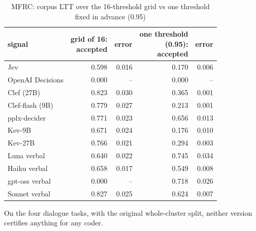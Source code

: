 \begin{table}[t]
\centering
\small
\caption{MFRC: corpus LTT over the 16-threshold grid vs one threshold fixed in advance (0.95)}
\label{tab:tab23_ltt_single_threshold}
\begin{adjustbox}{max width=\linewidth}
\begin{tabular}{lrrrr}
\toprule
signal & \makecell[br]{grid of 16: \\{} accepted} & error & \makecell[br]{one threshold \\{} (0.95): \\{} accepted} & error \\
\midrule
Jev & 0.598 & 0.016 & 0.170 & 0.006 \\
OpenAI Decisions & 0.000 & -- & 0.000 & -- \\
Clef (27B) & 0.823 & 0.030 & 0.365 & 0.001 \\
Clef-flash (9B) & 0.779 & 0.027 & 0.213 & 0.001 \\
pplx-decider & 0.771 & 0.023 & 0.656 & 0.013 \\
Kev-9B & 0.671 & 0.024 & 0.176 & 0.010 \\
Kev-27B & 0.766 & 0.021 & 0.294 & 0.003 \\
Luna verbal & 0.640 & 0.022 & 0.745 & 0.034 \\
Haiku verbal & 0.658 & 0.017 & 0.549 & 0.008 \\
gpt-oss verbal & 0.000 & -- & 0.718 & 0.026 \\
Sonnet verbal & 0.827 & 0.025 & 0.624 & 0.007 \\
\bottomrule
\end{tabular}
\end{adjustbox}
\par\smallskip\footnotesize\raggedright On the four dialogue tasks, with the original whole-cluster split, neither version certifies anything for any coder.
\end{table}
